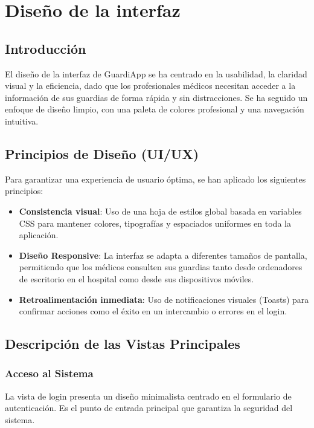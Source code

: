 \chapter{Diseño de la interfaz} \label{cap:diseno-interfaz}

\section{Introducción}
El diseño de la interfaz de GuardiApp se ha centrado en la usabilidad, la claridad visual y la eficiencia, dado que los profesionales médicos necesitan acceder a la información de sus guardias de forma rápida y sin distracciones. Se ha seguido un enfoque de diseño limpio, con una paleta de colores profesional y una navegación intuitiva.

\section{Principios de Diseño (UI/UX)}
Para garantizar una experiencia de usuario óptima, se han aplicado los siguientes principios:
\begin{itemize}
    \item \textbf{Consistencia visual}: Uso de una hoja de estilos global basada en variables CSS para mantener colores, tipografías y espaciados uniformes en toda la aplicación.
    \item \textbf{Diseño Responsive}: La interfaz se adapta a diferentes tamaños de pantalla, permitiendo que los médicos consulten sus guardias tanto desde ordenadores de escritorio en el hospital como desde sus dispositivos móviles.
    \item \textbf{Retroalimentación inmediata}: Uso de notificaciones visuales (Toasts) para confirmar acciones como el éxito en un intercambio o errores en el login.
\end{itemize}

\section{Descripción de las Vistas Principales}

\subsection{Acceso al Sistema}
La vista de login presenta un diseño minimalista centrado en el formulario de autenticación. Es el punto de entrada principal que garantiza la seguridad del sistema.

